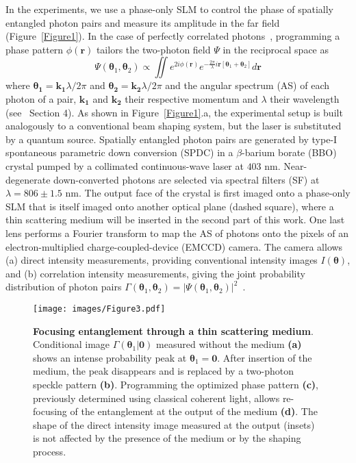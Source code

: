 \documentclass[%
 reprint,
 amsmath,amssymb,
 aps
]{revtex4-1}
\begin{document}
In the experiments, we use a phase-only SLM to control the phase of spatially entangled photon pairs and measure its amplitude in the far field (Figure~\ref{Figure1}). In the case of perfectly correlated photons~\cite{abouraddy_entangled-photon_2002}, programming a phase pattern $\phi(\boldsymbol{r})$ tailors the two-photon field $\Psi$ in the reciprocal space as
\begin{equation}
\label{equ1}
\Psi(\boldsymbol{\theta}_1,\boldsymbol{\theta}_2) \propto \iint  e^{2 i \phi(\boldsymbol{r})} e^{-\frac{2 \pi}{\lambda} i \boldsymbol{r} \left[ \boldsymbol{\theta}_1+\boldsymbol{\theta}_2 \right]} d \boldsymbol{r}
\end{equation}
where $\boldsymbol{\theta_1} = \boldsymbol{k_1} \lambda / 2 \pi $ and $\boldsymbol{\theta_2} = \boldsymbol{k_2} \lambda / 2 \pi $ and the angular spectrum (AS) of each photon of a pair, $\boldsymbol{k_1}$ and $\boldsymbol{k_2}$ their respective momentum and $\lambda$ their wavelength (see~\cite{supmat} Section 4). As shown in Figure~\ref{Figure1}.a, the experimental setup is built analogously to a conventional beam shaping system, but the laser is substituted by a quantum source. Spatially entangled photon pairs are generated by type-I spontaneous parametric down conversion (SPDC) in a $\beta$-barium borate (BBO) crystal pumped by a collimated continuous-wave laser at $403$ nm. Near-degenerate down-converted photons are selected via spectral filters (SF) at $\lambda = 806 \pm 1.5$ nm. The output face of the crystal is first imaged onto a phase-only SLM that is itself imaged onto another optical plane (dashed square), where a thin scattering medium will be inserted in the second part of this work. One last lens performs a Fourier transform to map the AS of photons onto the pixels of an electron-multiplied charge-coupled-device (EMCCD) camera. The camera allows (a) direct intensity measurements, providing conventional intensity images $I(\boldsymbol{\theta})$, and (b) correlation intensity measurements, giving the joint probability distribution of photon pairs $\Gamma(\boldsymbol{\theta}_1,\boldsymbol{\theta}_2)=|\Psi(\boldsymbol{\theta}_1,\boldsymbol{\theta}_2)|^2$~\cite{defienne_general_2018-1,reichert_massively_2018}.

\begin{figure*}
\texttt{[image: images/Figure3.pdf]}
\caption{\label{Figure3} \textbf{Focusing entanglement through a thin scattering medium}. Conditional image $\Gamma(\boldsymbol{\theta}_1|\boldsymbol{0})$ measured without the medium \textbf{(a)} shows an intense probability peak at $\boldsymbol{\theta}_1=\boldsymbol{0}$. After insertion of the medium, the peak disappears and is replaced by a two-photon speckle pattern \textbf{(b)}. Programming the optimized phase pattern \textbf{(c)}, previously determined using classical coherent light, allows re-focusing of the entanglement at the output of the medium \textbf{(d)}. The shape of the direct intensity image measured at the output (insets) is not affected by the presence of the medium or by the shaping process.}
\end{figure*}
\end{document}

